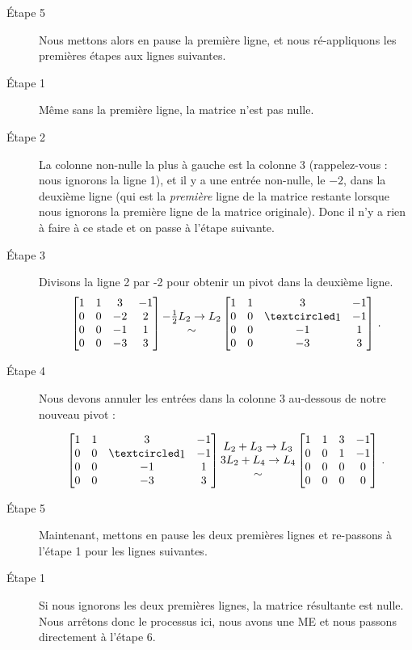 \begin{myexample}
\begin{description}
\item[Étape 5] Nous mettons alors en pause la premi\`ere ligne, et nous ré-appliquons les premières étapes aux lignes suivantes.
\item[Étape 1] Même sans la première ligne, la matrice n'est pas nulle.
\item[Étape 2] La colonne non-nulle la plus à gauche est la colonne 3 (rappelez-vous : nous ignorons la ligne 1), et il y a une entrée non-nulle, le $-2$, dans la deuxième ligne (qui est la {\it première} ligne de la matrice restante lorsque nous ignorons la première ligne de la matrice originale). Donc il n'y a rien à faire \`a ce stade et on passe \`a l'\'etape suivante.
\item[Étape 3] Divisons la ligne 2 par -2 pour obtenir un pivot dans la deuxième ligne.
$$\mat{1 & 1 & 3 & -1\\ 
0 & 0 & -2 & 2 \\
0 & 0 & -1 & 1 \\
0 & 0 & -3 & 3}
\begin{matrix} -\frac{1}{2} L_2\to L_2 \\ \sim \end{matrix} 
\mat{ 
1 & 1 & 3 & -1\\ 
0 & 0 & \pivot & -1 \\
0 & 0 & -1 & 1 \\
0 & 0 & -3 & 3}\,.$$  

\item[Étape 4] Nous devons annuler les entr\'ees dans la colonne 3 au-dessous de notre nouveau pivot : 

$$\mat{
1 & 1 & 3 & -1\\ 
0 & 0 & \pivot & -1 \\
0 & 0 & -1 & 1 \\
0 & 0 & -3 & 3}
\begin{matrix}  L_2+ L_3\to L_3 \\ 3L_2+ L_4\to L_4 \\\sim \end{matrix} 
\mat{ 
1 & 1 & 3 & -1\\ 
0 & 0 & 1 & -1 \\
0 & 0 & 0 & 0 \\
0 & 0 & 0 & 0}\,.$$
\item[Étape 5] Maintenant, mettons en pause les deux premières lignes et re-passons à l'étape 1 pour les lignes suivantes.

\item[Étape 1] Si nous ignorons les deux premières lignes, la matrice résultante est nulle. Nous arrêtons donc le processus ici, nous avons une ME et nous passons directement à l'étape 6.


\end{description}
\end{myexample}
